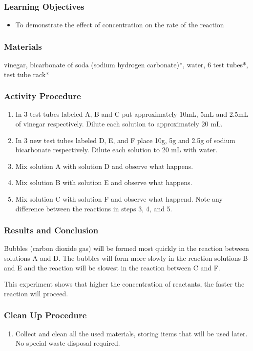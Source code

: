 \subsubsection*{Learning Objectives}
\begin{itemize}
\item{To demonstrate the effect of concentration on the rate of the reaction}
\end{itemize}

\subsubsection*{Materials}
vinegar, bicarbonate of soda (sodium hydrogen carbonate)*, water, 6 test tubes*, test tube rack*

\subsubsection*{Activity Procedure}
\begin{enumerate}
\item{In 3 test tubes labeled A, B and C put approximately 10mL, 5mL and 2.5mL of vinegar respectively. Dilute each solution to approximately 20 mL.}
\item{In 3 new test tubes labeled D, E, and F place 10g, 5g and 2.5g of sodium bicarbonate respectively. Dilute each solution to 20 mL with water.}
\item{Mix solution A with solution D and observe what happens.}
\item{Mix solution B with solution E and observe what happens.}
\item{Mix solution C with solution F and observe what happend. Note any difference between the reactions in steps 3, 4, and 5.}
\end{enumerate}

\subsubsection*{Results and Conclusion}
Bubbles (carbon dioxide gas) will be formed most quickly in the reaction between solutions A and D. The bubbles will form more slowly in the reaction solutions B and E and the reaction will be slowest in the reaction between C and F. 

This experiment shows that higher the concentration of reactants, the faster the reaction will proceed.

\subsubsection*{Clean Up Procedure}
\begin{enumerate}
\item{Collect and clean all the used materials, storing items that will be used later. No special waste disposal required.}
\end{enumerate}

